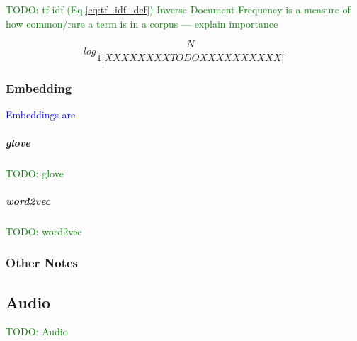 \textcolor{green}{TODO: tf-idf (Eq.\ref{eq:tf_idf_def}) Inverse Document Frequency is a measure of how common/rare a term is in a corpus --- explain importance}

\begin{equation}
{log\frac{N}{1|XXXXXXXXTODOXXXXXXXXXX|}}
\label{eq:tf_idf_def}
\end{equation}

\subsubsection{Embedding}





\textcolor{blue}{Embeddings are }

\subparagraph{glove}

\textcolor{green}{TODO: glove}

\subparagraph{word2vec}

\textcolor{green}{TODO: word2vec}

\subsubsection{Other Notes}


\subsection{Audio}


\textcolor{green}{TODO: Audio}
